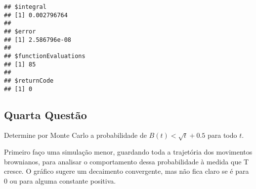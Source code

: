 \documentclass[]{article}
\newenvironment{Shaded}{\begin{snugshade}}{\end{snugshade}}
\newcommand{\KeywordTok}[1]{\textcolor[rgb]{0.13,0.29,0.53}{\textbf{#1}}}
\newcommand{\DataTypeTok}[1]{\textcolor[rgb]{0.13,0.29,0.53}{#1}}
\newcommand{\DecValTok}[1]{\textcolor[rgb]{0.00,0.00,0.81}{#1}}
\newcommand{\FloatTok}[1]{\textcolor[rgb]{0.00,0.00,0.81}{#1}}
\newcommand{\StringTok}[1]{\textcolor[rgb]{0.31,0.60,0.02}{#1}}
\newcommand{\CommentTok}[1]{\textcolor[rgb]{0.56,0.35,0.01}{\textit{#1}}}
\newcommand{\OtherTok}[1]{\textcolor[rgb]{0.56,0.35,0.01}{#1}}
\newcommand{\ControlFlowTok}[1]{\textcolor[rgb]{0.13,0.29,0.53}{\textbf{#1}}}
\newcommand{\OperatorTok}[1]{\textcolor[rgb]{0.81,0.36,0.00}{\textbf{#1}}}
\newcommand{\NormalTok}[1]{#1}
\begin{document}
\begin{verbatim}
## $integral
## [1] 0.002796764
## 
## $error
## [1] 2.586796e-08
## 
## $functionEvaluations
## [1] 85
## 
## $returnCode
## [1] 0
\end{verbatim}

\subsection{Quarta Questão}\label{quarta-questao}

Determine por Monte Carlo a probabilidade de \(B(t) < \sqrt t + 0.5\)
para todo \(t\).

Primeiro faço uma simulação menor, guardando toda a trajetória dos
movimentos brownianos, para analisar o comportamento dessa probabilidade
à medida que T cresce. O gráfico sugere um decaimento convergente, mas
não fica claro se é para 0 ou para alguma constante positiva.

\begin{Shaded}
\end{Shaded}
\end{document}
